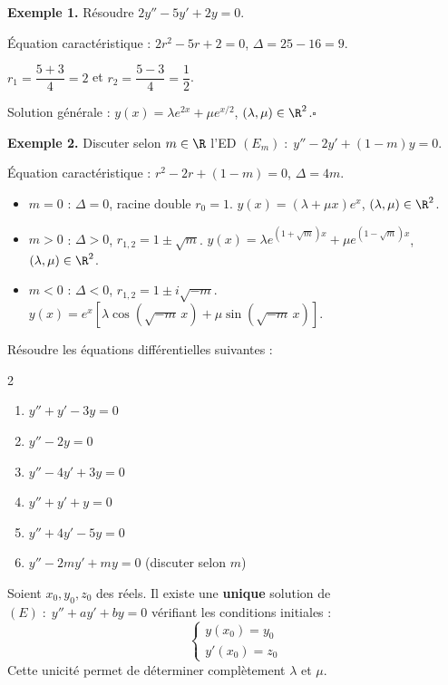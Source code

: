 \Exemples

\textbf{Exemple 1.} R\'esoudre $2y''-5y'+2y=0$.

\'Equation caract\'eristique : $2r^2-5r+2=0$, $\Delta=25-16=9$.

$r_1=\dfrac{5+3}{4}=2$ et $r_2=\dfrac{5-3}{4}=\dfrac{1}{2}$.

Solution g\'en\'erale : $y(x)=\lambda e^{2x}+\mu e^{x/2}$, $(\lambda,\mu)\in\R^2$.\hfill$\square$

\textbf{Exemple 2.} Discuter selon $m\in\R$ l'ED $(E_m)\;:\;y''-2y'+(1-m)y=0$.

\'Equation caract\'eristique : $r^2-2r+(1-m)=0$, $\Delta=4m$.

\begin{itemize}
  \item $m=0$ : $\Delta=0$, racine double $r_0=1$.
        $y(x)=(\lambda+\mu x)e^x$, $(\lambda,\mu)\in\R^2$.
  \item $m>0$ : $\Delta>0$, $r_{1,2}=1\pm\sqrt{m}$.
        $y(x)=\lambda e^{(1+\sqrt{m})x}+\mu e^{(1-\sqrt{m})x}$, $(\lambda,\mu)\in\R^2$.
  \item $m<0$ : $\Delta<0$, $r_{1,2}=1\pm i\sqrt{-m}$.
        $y(x)=e^x\!\left[\lambda\cos\!\left(\sqrt{-m}\,x\right)+\mu\sin\!\left(\sqrt{-m}\,x\right)\right]$.
\end{itemize}

\begin{Application}
R\'esoudre les \'equations diff\'erentielles suivantes :
\begin{multicols}{2}
\begin{enumerate}
  \item $y''+y'-3y=0$
  \item $y''-2y=0$
  \item $y''-4y'+3y=0$
  \item $y''+y'+y=0$
  \item $y''+4y'-5y=0$
  \item $y''-2my'+my=0$ (discuter selon $m$)
\end{enumerate}
\end{multicols}
\end{Application}

\begin{Remarque}
Soient $x_0,y_0,z_0$ des r\'eels. Il existe une \textbf{unique} solution de $(E)\;:\;y''+ay'+by=0$
v\'erifiant les conditions initiales :
\[
  \begin{cases}y(x_0)=y_0\\y'(x_0)=z_0\end{cases}
\]
Cette unicit\'e permet de d\'eterminer compl\`etement $\lambda$ et $\mu$.
\end{Remarque}

